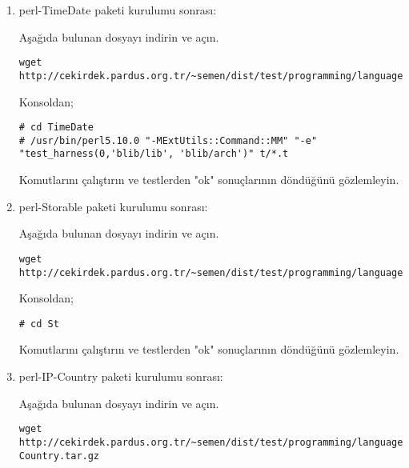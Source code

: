 \documentclass[a4paper,10pt]{article}
\begin{document}
\begin{enumerate}
\item perl-TimeDate paketi kurulumu sonrası:

Aşağıda bulunan dosyayı indirin ve açın.
\begin{verbatim}
wget http://cekirdek.pardus.org.tr/~semen/dist/test/programming/language/perl/TimeDate.tar.gz
\end{verbatim}

Konsoldan;
\begin{verbatim}
# cd TimeDate
# /usr/bin/perl5.10.0 "-MExtUtils::Command::MM" "-e" "test_harness(0,'blib/lib', 'blib/arch')" t/*.t
\end{verbatim}

Komutlarını çalıştırın ve testlerden "ok" sonuçlarının döndüğünü gözlemleyin.

\item perl-Storable paketi kurulumu sonrası:

Aşağıda bulunan dosyayı indirin ve açın.
\begin{verbatim}
wget http://cekirdek.pardus.org.tr/~semen/dist/test/programming/language/perl/Storable.tar.gz
\end{verbatim}

Konsoldan;
\begin{verbatim}
# cd St
\end{verbatim}

Komutlarını çalıştırın ve testlerden "ok" sonuçlarının döndüğünü gözlemleyin.

% 
% 
% 

\item perl-IP-Country paketi kurulumu sonrası:

Aşağıda bulunan dosyayı indirin ve açın.
\begin{verbatim}
wget http://cekirdek.pardus.org.tr/~semen/dist/test/programming/language/perl/IP-Country.tar.gz
\end{verbatim}


\end{enumerate}
\end{document}
